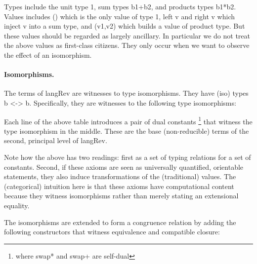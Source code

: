 \documentclass{llncs}
\begin{document}
Types include the unit type {{1}}, sum types {{b1+b2}}, and products types
{{b1*b2}}.  Values includes {{()}} which is the only value of type {{1}},
{{left v}} and {{right v}} which inject {{v}} into a sum type, and
{{(v1,v2)}} which builds a value of product type. But these values should be
regarded as largely ancillary.  In particular we do not treat the above
values as first-class citizens.  They only occur when we want to observe the
effect of an isomorphism.

\paragraph*{Isomorphisms.} The terms of {{langRev}} are witnesses to type
isomorphisms.  They have (iso) types {{b <-> b}}.  
Specifically, they are witnesses to the following type isomorphisms:

\noindent Each line of the above table introduces a pair of dual constants%
\footnote{where {{swap*}} and {{swap+}} are self-dual} that witness the type
isomorphism in the middle.  These are the base (non-reducible) terms of the
second, principal level of {{langRev}}.

Note how the above has two readings: first as a set of typing relations for a
set of constants. Second, if these axioms are seen as universally quantified,
orientable statements, they also induce transformations of the (traditional)
values.  The (categorical) intuition here is that these axioms have
computational content because they witness isomorphisms rather than merely
stating an extensional equality.

The isomorphisms are extended to form a congruence relation by adding the
following constructors that witness equivalence and compatible closure:
%
%
%
\end{document}
